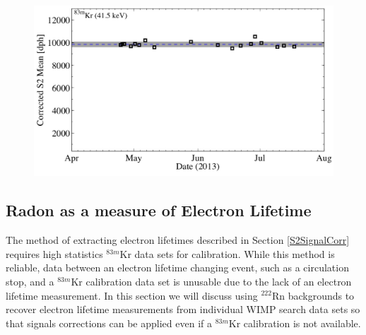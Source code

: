 \documentclass[a4paper,12pt]{article}
\begin{document}
{\begin{figure} [!h]
\includegraphics[scale=.3]{CorrectedS2_Stability.png} 
\label{KrS2Stability}
\end{figure}

\subsection{Radon as a measure of Electron Lifetime}

The method of extracting electron lifetimes described in Section \ref{S2SignalCorr} requires high statistics $^{83m}$Kr data sets for calibration.  While this method is reliable, data between an electron lifetime changing event, such as a circulation stop, and a $^{83m}$Kr calibration data set is unusable due to the lack of an electron lifetime measurement.  In this section we will discuss using $^{222}$Rn backgrounds to recover electron lifetime measurements from individual WIMP search data sets so that signals corrections can be applied even if a $^{83m}$Kr calibration is not available.

}
\end{document}
